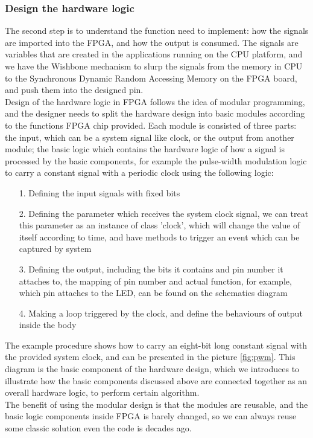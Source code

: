 \documentclass[11pt,openright,a4paper]{report}
\begin{document}
\subsubsection{Design the hardware logic}
The second step is to understand the function need to implement: how the signals are imported into the FPGA, and how the output is consumed. The signals are variables that are created in the applications running on the CPU platform, and we have the Wishbone mechanism to slurp the signals from the memory in CPU to the Synchronous Dynamic Random Accessing Memory on the FPGA board, and push them into the designed pin. \\
Design of the hardware logic in FPGA follows the idea of modular programming, and the designer needs to split the hardware design into basic modules according to the functions FPGA chip provided. Each module is consisted of three parts: the input, which can be a system signal like clock, or the output from another module; the basic logic which contains the hardware logic of how a signal is processed by the basic components, for example the pulse-width modulation logic to carry a constant signal with a periodic clock using the following logic:
\begin{itemize}
	\item[1.] Defining the input signals with fixed bits
	\item[2.] Defining the parameter which receives the system clock signal, we can treat this parameter as an instance of class 'clock', which will change the value of itself according to time, and have methods to trigger an event which can be captured by system
	\item[3.] Defining the output, including the bits it contains and pin number it attaches to, the mapping of pin number and actual function, for example, which pin attaches to the LED, can be found on the schematics diagram
	\item[4.] Making a loop triggered by the clock, and define the behaviours of output inside the body
\end{itemize}	
The example procedure shows how to carry an eight-bit long constant signal with the provided system clock, and can be presented in the picture \ref{fig:pwm}. This diagram is the basic component of the hardware design, which we introduces to illustrate how the basic components discussed above are connected together as an overall hardware logic, to perform certain algorithm.\\
The benefit of using the modular design is that the modules are reusable, and the basic logic components inside FPGA is barely changed, so we can always reuse some classic solution even the code is decades ago.\\
\end{document}
